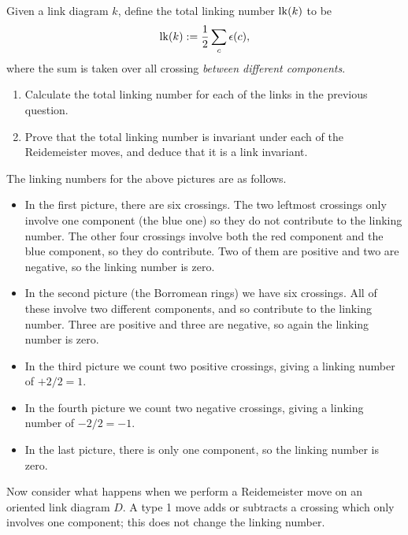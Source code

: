 \documentclass[a4paper]{amsart}
\begin{document}
\vspace{-4ex}
\begin{exercise}
 Given a link diagram $k$, define the total linking number $\operatorname{lk}(k)$ to be
 \[ \operatorname{lk}(k):=\frac12\sum_c \epsilon(c), \]
 where the sum is taken over all crossing \emph{between different
  components}. 
 \begin{enumerate}
  \item Calculate the total linking number for each of the links in
   the previous question. 
  \item Prove that the total linking number is invariant under each of
   the Reidemeister moves, and deduce that it is a link invariant. 
 \end{enumerate}
\end{exercise}
\begin{solution}
 The linking numbers for the above pictures are as follows.
 \begin{itemize}
  \item In the first picture, there are six crossings.  The two
   leftmost crossings only involve one component (the blue one) so they
   do not contribute to the linking number.  The other four crossings
   involve both the red component and the blue component, so they do
   contribute.  Two of them are positive and two are negative, so the
   linking number is zero.
  \item In the second picture (the Borromean rings) we have six
   crossings.  All of these involve two different components, and so
   contribute to the linking number.  Three are positive and three are
   negative, so again the linking number is zero.
  \item In the third picture we count two positive crossings, giving a
   linking number of $+2/2=1$.
  \item In the fourth picture we count two negative crossings, giving a
   linking number of $-2/2=-1$.
  \item In the last picture, there is only one component, so the linking
   number is zero.
 \end{itemize}
 Now consider what happens when we perform a Reidemeister move on an
 oriented link diagram $D$.  A type 1 move adds or subtracts a
 crossing which only involves one component; this does not change the
 linking number.
 \begin{center}
\end{center}
\end{solution}
\end{document}
